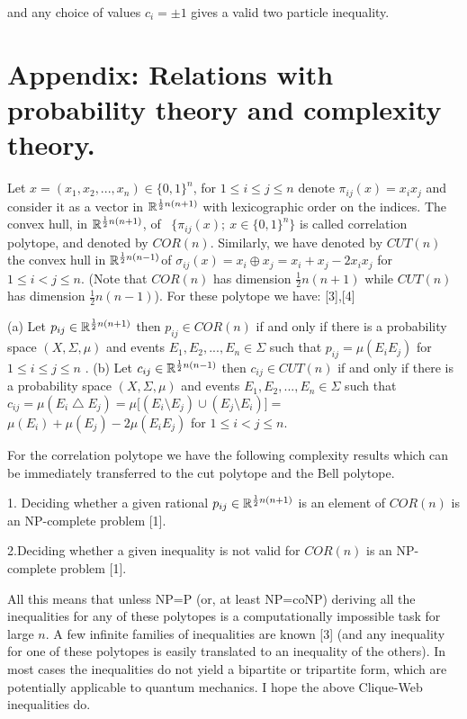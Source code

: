 and any choice of values $c_{i}=\pm 1$ gives a valid two particle inequality.

\section{Appendix: Relations with probability theory and complexity theory.}

Let $x=(x_{1},x_{2},...,x_{n})\in \{0,1\}^{n}$, for $1\leq i\leq j\leq n$
denote $\pi _{ij}(x)=x_{i}x_{j}$ and consider it as a vector in ${\Bbb R}^{%
\frac{1}{2}n(n+1)}$ with lexicographic order on the indices. The convex
hull, in ${\Bbb R}^{\frac{1}{2}n(n+1)}$, of \ $\{\pi _{ij}(x);\ x\in
\{0,1\}^{n}\}$ is called correlation polytope, and denoted by $COR(n)$.
Similarly, we have denoted by $CUT(n)$ the convex hull in ${\Bbb R}^{\frac{1%
}{2}n(n-1)}$of $\sigma _{ij}(x)=x_{i}\oplus x_{j}=x_{i}+x_{j}-2x_{i}x_{j}$
for $1\leq i<j\leq n$. (Note that $COR(n)$ has dimension $\frac{1}{2}n(n+1)$
while $CUT(n)$ has dimension $\frac{1}{2}n(n-1)$). For these polytope we
have: [3],[4]

\begin{theorem}
(a) Let $p_{ij}\in {\Bbb R}^{\frac{1}{2}n(n+1)}$ then $p_{ij}\in COR(n)$ if
and only if there is a probability space $(X,\Sigma ,\mu )$ and events $%
E_{1},E_{2},...,E_{n}\in \Sigma $ such that $p_{ij}=\mu (E_{i}E_{j})$ for $%
1\leq i\leq j\leq n$ . (b) Let $c_{ij}\in {\Bbb R}^{\frac{1}{2}n(n-1)}$ then
$c_{ij}\in CUT(n)$ if and only if there is a probability space $(X,\Sigma
,\mu )$ and events $E_{1},E_{2},...,E_{n}\in \Sigma $ such that $c_{ij}=\mu
(E_{i}\bigtriangleup E_{j})=\mu \lbrack (E_{i}\setminus E_{j})\cup
(E_{j}\setminus E_{i})]=$ $\mu (E_{i})+\mu (E_{j})-2\mu (E_{i}E_{j})$ for $%
1\leq i<j\leq n$.
\end{theorem}

For the correlation polytope we have the following complexity results which
can be immediately transferred to the cut polytope and the Bell polytope.

{\large 1. }Deciding whether a given rational $p_{ij}\in {\Bbb R}^{\frac{1}{2%
}n(n+1)}$ is an element of $COR(n)$ is an NP-complete problem [1].

{\large 2.}Deciding whether a given inequality is not valid for $COR(n)$ is
an NP-complete problem [1].

All this means that unless NP=P (or, at least NP=coNP) deriving all the
inequalities for any of these polytopes is a computationally impossible task
for large $n$. A few infinite families of inequalities are known [3] (and
any inequality for one of these polytopes is easily translated to an
inequality of the others). In most cases the inequalities do not yield a
bipartite or tripartite form, which are potentially applicable to quantum
mechanics. I hope the above Clique-Web inequalities do.\newpage

